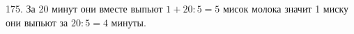 175. За 20 минут они вместе выпьют $1+20:5=5$ мисок молока значит 1 миску они выпьют за $20:5=4$ минуты.\\

